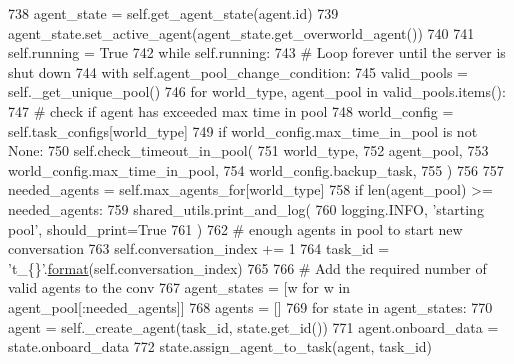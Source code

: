 \begin{DoxyCode}
738                 agent\_state = self.get\_agent\_state(agent.id)
739                 agent\_state.set\_active\_agent(agent\_state.get\_overworld\_agent())
740 
741         self.running = \textcolor{keyword}{True}
742         \textcolor{keywordflow}{while} self.running:
743             \textcolor{comment}{# Loop forever until the server is shut down}
744             with self.agent\_pool\_change\_condition:
745                 valid\_pools = self.\_get\_unique\_pool()
746                 \textcolor{keywordflow}{for} world\_type, agent\_pool \textcolor{keywordflow}{in} valid\_pools.items():
747                     \textcolor{comment}{# check if agent has exceeded max time in pool}
748                     world\_config = self.task\_configs[world\_type]
749                     \textcolor{keywordflow}{if} world\_config.max\_time\_in\_pool \textcolor{keywordflow}{is} \textcolor{keywordflow}{not} \textcolor{keywordtype}{None}:
750                         self.check\_timeout\_in\_pool(
751                             world\_type,
752                             agent\_pool,
753                             world\_config.max\_time\_in\_pool,
754                             world\_config.backup\_task,
755                         )
756 
757                     needed\_agents = self.max\_agents\_for[world\_type]
758                     \textcolor{keywordflow}{if} len(agent\_pool) >= needed\_agents:
759                         shared\_utils.print\_and\_log(
760                             logging.INFO, \textcolor{stringliteral}{'starting pool'}, should\_print=\textcolor{keyword}{True}
761                         )
762                         \textcolor{comment}{# enough agents in pool to start new conversation}
763                         self.conversation\_index += 1
764                         task\_id = \textcolor{stringliteral}{'t\_\{\}'}.\hyperlink{namespaceparlai_1_1chat__service_1_1services_1_1messenger_1_1shared__utils_a32e2e2022b824fbaf80c747160b52a76}{format}(self.conversation\_index)
765 
766                         \textcolor{comment}{# Add the required number of valid agents to the conv}
767                         agent\_states = [w \textcolor{keywordflow}{for} w \textcolor{keywordflow}{in} agent\_pool[:needed\_agents]]
768                         agents = []
769                         \textcolor{keywordflow}{for} state \textcolor{keywordflow}{in} agent\_states:
770                             agent = self.\_create\_agent(task\_id, state.get\_id())
771                             agent.onboard\_data = state.onboard\_data
772                             state.assign\_agent\_to\_task(agent, task\_id)

\end{DoxyCode}
